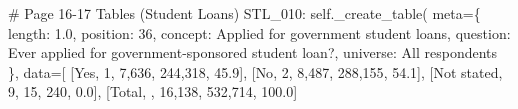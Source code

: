 \documentclass[
  11pt,
  a4paper,
]{article}
\newenvironment{Shaded}{\begin{snugshade}}{\end{snugshade}}
\newcommand{\CommentTok}[1]{\textcolor[rgb]{0.37,0.37,0.37}{#1}}
\newcommand{\NormalTok}[1]{\textcolor[rgb]{0.00,0.23,0.31}{#1}}
\newcommand{\OperatorTok}[1]{\textcolor[rgb]{0.37,0.37,0.37}{#1}}
\newcommand{\StringTok}[1]{\textcolor[rgb]{0.13,0.47,0.30}{#1}}
\newcommand{\VariableTok}[1]{\textcolor[rgb]{0.07,0.07,0.07}{#1}}
\begin{document}
\begin{Shaded}
\begin{Highlighting}[]
            \CommentTok{\# Page 16{-}17 Tables (Student Loans)}
            \StringTok{\textquotesingle{}STL\_010\textquotesingle{}}\NormalTok{: }\VariableTok{self}\NormalTok{.\_create\_table(}
\NormalTok{                meta}\OperatorTok{=}\NormalTok{\{}
                    \StringTok{\textquotesingle{}length\textquotesingle{}}\NormalTok{: }\StringTok{\textquotesingle{}1.0\textquotesingle{}}\NormalTok{, }\StringTok{\textquotesingle{}position\textquotesingle{}}\NormalTok{: }\StringTok{\textquotesingle{}36\textquotesingle{}}\NormalTok{,}
                    \StringTok{\textquotesingle{}concept\textquotesingle{}}\NormalTok{: }\StringTok{\textquotesingle{}Applied for government student loans\textquotesingle{}}\NormalTok{,}
                    \StringTok{\textquotesingle{}question\textquotesingle{}}\NormalTok{: }\StringTok{\textquotesingle{}Ever applied for government{-}sponsored student loan?\textquotesingle{}}\NormalTok{,}
                    \StringTok{\textquotesingle{}universe\textquotesingle{}}\NormalTok{: }\StringTok{\textquotesingle{}All respondents\textquotesingle{}}
\NormalTok{                \},}
\NormalTok{                data}\OperatorTok{=}\NormalTok{[}
\NormalTok{                    [}\StringTok{\textquotesingle{}Yes\textquotesingle{}}\NormalTok{, }\StringTok{\textquotesingle{}1\textquotesingle{}}\NormalTok{, }\StringTok{\textquotesingle{}7,636\textquotesingle{}}\NormalTok{, }\StringTok{\textquotesingle{}244,318\textquotesingle{}}\NormalTok{, }\StringTok{\textquotesingle{}45.9\textquotesingle{}}\NormalTok{],}
\NormalTok{                    [}\StringTok{\textquotesingle{}No\textquotesingle{}}\NormalTok{, }\StringTok{\textquotesingle{}2\textquotesingle{}}\NormalTok{, }\StringTok{\textquotesingle{}8,487\textquotesingle{}}\NormalTok{, }\StringTok{\textquotesingle{}288,155\textquotesingle{}}\NormalTok{, }\StringTok{\textquotesingle{}54.1\textquotesingle{}}\NormalTok{],}
\NormalTok{                    [}\StringTok{\textquotesingle{}Not stated\textquotesingle{}}\NormalTok{, }\StringTok{\textquotesingle{}9\textquotesingle{}}\NormalTok{, }\StringTok{\textquotesingle{}15\textquotesingle{}}\NormalTok{, }\StringTok{\textquotesingle{}240\textquotesingle{}}\NormalTok{, }\StringTok{\textquotesingle{}0.0\textquotesingle{}}\NormalTok{],}
\NormalTok{                    [}\StringTok{\textquotesingle{}Total\textquotesingle{}}\NormalTok{, }\StringTok{\textquotesingle{}\textquotesingle{}}\NormalTok{, }\StringTok{\textquotesingle{}16,138\textquotesingle{}}\NormalTok{, }\StringTok{\textquotesingle{}532,714\textquotesingle{}}\NormalTok{, }\StringTok{\textquotesingle{}100.0\textquotesingle{}}\NormalTok{]}

\end{Highlighting}
\end{Shaded}
\end{document}
